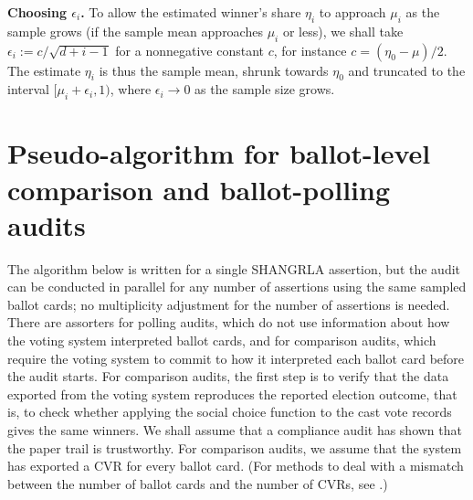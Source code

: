 \documentclass[aoas]{imsart}
\begin{document}
{\bf Choosing $\epsilon_i$.}
To allow the estimated winner's share $\eta_i$ to approach
$\mu_i$ as the sample grows (if the sample mean approaches $\mu_i$ or less),
we shall take $\epsilon_i := c/\sqrt{d+i-1}$ for a nonnegative constant $c$,
for instance $c=(\eta_0-\mu)/2$.
The estimate $\eta_i$ is thus the sample mean,
shrunk towards $\eta_0$ and truncated to the interval $[\mu_i + \epsilon_i, 1)$, where
$\epsilon_i \rightarrow 0$ as the sample size grows.

\section{Pseudo-algorithm for ballot-level comparison and ballot-polling audits}

The algorithm below is written for a single SHANGRLA assertion, but the audit can be conducted in parallel
for any number of assertions using the same sampled ballot cards; no multiplicity adjustment for the number
of assertions is needed.
There are assorters for polling audits, which do not use information about how the voting system interpreted
ballot cards, and for comparison audits, which require the voting system to commit to how it interpreted
each ballot card before the audit starts.
For comparison audits, the first step is to verify that the data exported from the voting system
reproduces the reported election outcome, that is, to check whether applying the social choice function to the
cast vote records gives the same winners.
We shall assume that a compliance audit has shown that the paper trail is trustworthy.
For comparison audits, we assume that the system has exported a CVR for every ballot card.
(For methods to deal with a mismatch between the number of ballot cards and the number of CVRs, see
\citet{stark20}.)
\end{document}
